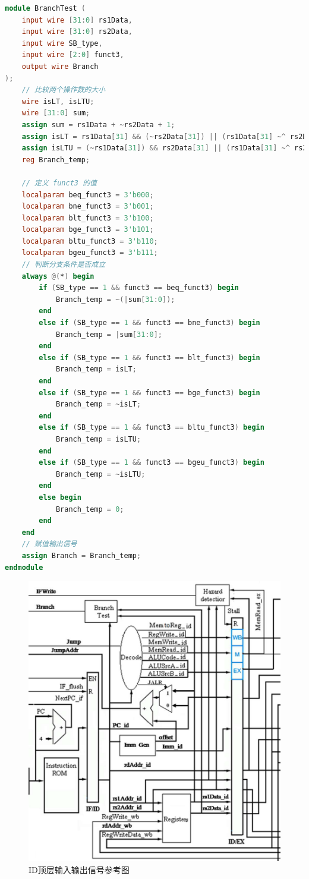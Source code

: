 \documentclass[12pt,hyperref,a4paper,UTF8]{ctexart}
\begin{document}
\begin{lstlisting}[language=Verilog,caption={Branch Test模块}]
module BranchTest (
    input wire [31:0] rs1Data,
    input wire [31:0] rs2Data,
    input wire SB_type,
    input wire [2:0] funct3,
    output wire Branch
);
    // 比较两个操作数的大小
    wire isLT, isLTU;
    wire [31:0] sum;
    assign sum = rs1Data + ~rs2Data + 1;
    assign isLT = rs1Data[31] && (~rs2Data[31]) || (rs1Data[31] ~^ rs2Data[31]) && sum[31];
    assign isLTU = (~rs1Data[31]) && rs2Data[31] || (rs1Data[31] ~^ rs2Data[31]) && sum[31];
    reg Branch_temp;

    // 定义 funct3 的值
    localparam beq_funct3 = 3'b000;
    localparam bne_funct3 = 3'b001;
    localparam blt_funct3 = 3'b100;
    localparam bge_funct3 = 3'b101;
    localparam bltu_funct3 = 3'b110;
    localparam bgeu_funct3 = 3'b111;
    // 判断分支条件是否成立
    always @(*) begin
        if (SB_type == 1 && funct3 == beq_funct3) begin
            Branch_temp = ~(|sum[31:0]);
        end
        else if (SB_type == 1 && funct3 == bne_funct3) begin
            Branch_temp = |sum[31:0];
        end
        else if (SB_type == 1 && funct3 == blt_funct3) begin
            Branch_temp = isLT;
        end
        else if (SB_type == 1 && funct3 == bge_funct3) begin
            Branch_temp = ~isLT;
        end
        else if (SB_type == 1 && funct3 == bltu_funct3) begin
            Branch_temp = isLTU;
        end
        else if (SB_type == 1 && funct3 == bgeu_funct3) begin
            Branch_temp = ~isLTU;
        end
        else begin
            Branch_temp = 0;
        end
    end
    // 赋值输出信号
    assign Branch = Branch_temp;
endmodule
\end{lstlisting}
\begin{figure}[H]
    \centering
    \includegraphics[width=1\textwidth]{figures/fig/image8.png}
    \caption{ID顶层输入输出信号参考图}
\end{figure}
\end{document}
